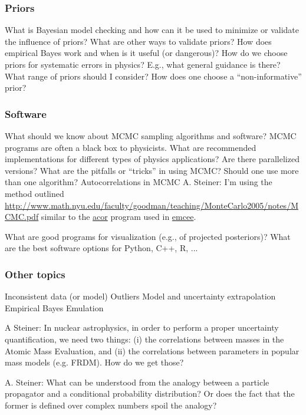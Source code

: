   \subsubsection{Priors}

  \bi
    \I What is Bayesian model checking and how can it be used
      to minimize or validate the influence of priors?
    \I What are other ways to validate priors?
    \I How does empirical Bayes work and when is it useful
      (or dangerous)?
    \I How do we choose priors for systematic errors in
      physics?
    \bi
      \I E.g., what general guidance is there?
      \I What range of priors should I consider?
      \I How does one choose a ``non-informative'' prior?
    \ei
  \ei
  
  \subsubsection{Software}

  \bi
    \I What should we know about MCMC sampling algorithms and
      software?
    \bi
      \I MCMC programs are often a black box to physicists.
      \I What are recommended implementations for different
	types of physics applications?
      \I Are there parallelized versions?
      \I What are the pitfalls or ``tricks'' in using MCMC?
      \I Should one use more than one algorithm?
    \I Autocorrelations in MCMC
    \bi
      \I A. Steiner: I'm using the method outlined
	\url{http://www.math.nyu.edu/faculty/goodman/teaching/MonteCarlo2005/notes/MCMC.pdf}
	similar to the \href{http://www.math.nyu.edu/faculty/goodman/software/acor/}{acor} program used in \href{http://dan.iel.fm/emcee/}{emcee}.
      
    \ei
    \ei
    \I What are good programs for visualization (e.g., of
      projected posteriors)?
    \I What are the best software options for Python, C++, R, ...  
  \ei

  \subsubsection{Other topics}

  \bi
    \I Inconsistent data (or model)
    \I Outliers
    \I Model and uncertainty extrapolation
    \I Empirical Bayes
    \I Emulation

    \I 
      A Steiner: In nuclear astrophysics, in order to
      perform a proper uncertainty quantification, we need two
      things: (i) the correlations between masses in the
      Atomic Mass Evaluation, and (ii) the correlations
      between parameters in popular mass models (e.g. FRDM).
      How do we get those?
    
    \I A. Steiner: What can be understood from the
      analogy between a particle propagator and a conditional
      probability distribution? Or does the fact that the
      former is defined over complex numbers spoil the analogy?
    \ei

